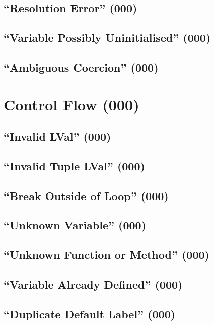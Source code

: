 \subsection{``Resolution Error'' (000)}

\subsection{``Variable Possibly Uninitialised'' (000)}

\subsection{``Ambiguous Coercion'' (000)}


\section{Control Flow (000)}

\subsection{``Invalid LVal'' (000)}

\subsection{``Invalid Tuple LVal'' (000)}

\subsection{``Break Outside of Loop'' (000)}

\subsection{``Unknown Variable'' (000)}

\subsection{``Unknown Function or Method'' (000)}

\subsection{``Variable Already Defined'' (000)}

\subsection{``Duplicate Default Label'' (000)}

